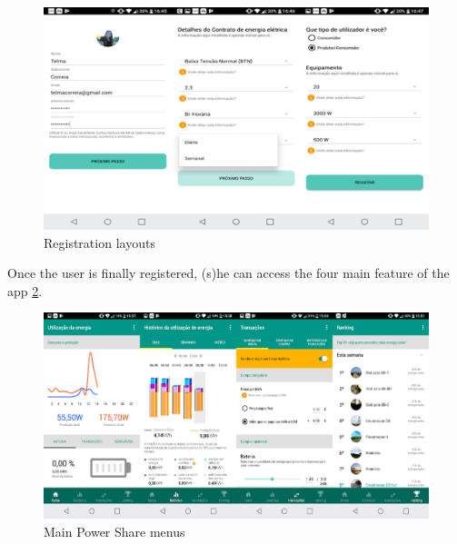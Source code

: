 \begin{figure}[h]
\centering
\includegraphics[width=1\textwidth]{./Images/ps3}
\caption{Registration layouts}
\label{fig:ps3}
\end{figure}


Once the user is finally registered, (s)he can access the four main feature of the app \cref{fig:ps4}.


\begin{figure}[h]
\centering
\includegraphics[width=1\textwidth]{./Images/ps4}
\caption{Main Power Share menus}
\label{fig:ps4}
\end{figure}


